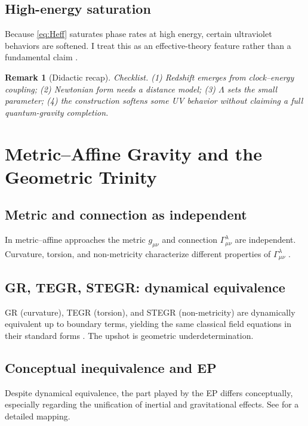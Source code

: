 \documentclass[11pt,a4paper]{article}
\theoremstyle{thmstyleone}
\theoremstyle{thmstyletwo}
\newtheorem{remark}{Remark}
\theoremstyle{thmstylethree}
\begin{document}
    \subsection{High-energy saturation}\label{subsec:uv}
        Because \eqref{eq:Heff} saturates phase rates at high energy, certain ultraviolet behaviors are softened. I treat this as an effective-theory feature rather than a fundamental claim \cite{SinghFriedrich2025}.

        \begin{remark}[Didactic recap]
            \emph{Checklist.} (1) Redshift emerges from clock–energy coupling; (2) Newtonian form needs a distance model; (3) $\Lambda$ sets the small parameter; (4) the construction softens some UV behavior without claiming a full quantum-gravity completion.
        \end{remark}

    \section{Metric--Affine Gravity and the Geometric Trinity}\label{sec:trinity}

    \subsection{Metric and connection as independent}\label{subsec:metric_affine}
        In metric--affine approaches the metric $g_{\mu\nu}$ and connection $\Gamma^\lambda_{\mu\nu}$ are independent. Curvature, torsion, and non-metricity characterize different properties of $\Gamma^\lambda_{\mu\nu}$ \cite{AldrovandiPereira2013,BeltranJimenez2018}.

    \subsection{GR, TEGR, STEGR: dynamical equivalence}\label{subsec:equivalence}
        GR (curvature), TEGR (torsion), and STEGR (non-metricity) are dynamically equivalent up to boundary terms, yielding the same classical field equations in their standard forms \cite{BeltranJimenez2018,AldrovandiPereira2013}. The upshot is geometric underdetermination.

    \subsection{Conceptual inequivalence and EP}\label{subsec:conceptual}
        Despite dynamical equivalence, the part played by the EP differs conceptually, especially regarding the unification of inertial and gravitational effects. See \cite{ManciniTinoCapozziello2025} for a detailed mapping.
\end{document}
